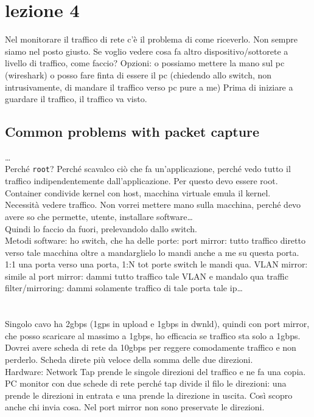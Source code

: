 \documentclass[10pt]{book}
\begin{document}
\section{lezione 4}
Nel monitorare il traffico di rete c'è il problema di come riceverlo. Non sempre siamo nel posto giusto. Se voglio vedere cosa fa altro dispositivo/sottorete a livello di traffico, come faccio? Opzioni: o possiamo mettere la mano sul pc (wireshark) o posso fare finta di essere il pc (chiedendo allo switch, non intrusivamente, di mandare il traffico verso pc pure a me) Prima di iniziare a guardare il traffico, il traffico va visto.\\
\subsection{Common problems with packet capture}
\ldots\\
Perché \texttt{root}? Perché scavalco ciò che fa un'applicazione, perché vedo tutto il traffico indipendentemente dall'applicazione. Per questo devo essere root.\\
Container condivide kernel con host, macchina virtuale emula il kernel.\\
Necessità vedere traffico. Non vorrei mettere mano sulla macchina, perché devo avere so che permette, utente, installare software\ldots\\
Quindi lo faccio da fuori, prelevandolo dallo switch.\\
Metodi software: ho switch, che ha delle porte:
port mirror: tutto traffico diretto verso tale macchina oltre a mandarglielo lo mandi anche a me su questa porta. 1:1 una porta verso una porta, 1:N tot porte switch le mandi qua.
VLAN mirror: simile al port mirror: dammi tutto traffico tale VLAN e mandalo qua
traffic filter/mirroring: dammi solamente traffico di tale porta tale ip\ldots\\\\\\
Singolo cavo ha 2gbps (1gps in upload e 1gbps in dwnld), quindi con port mirror, che posso scaricare al massimo a 1gbps, ho efficacia se traffico sta solo a 1gbps. Dovrei avere scheda di rete da 10gbps per reggere comodamente traffico e non perderlo. Scheda direte più veloce della somma delle due direzioni.\\
Hardware: Network Tap prende le singole direzioni del traffico e ne fa una copia. PC monitor con due schede di rete perché tap divide il filo le direzioni: una prende le direzioni in entrata e una prende la direzione in uscita. Così scopro anche chi invia cosa. Nel port mirror non sono preservate le direzioni.
\end{document}
